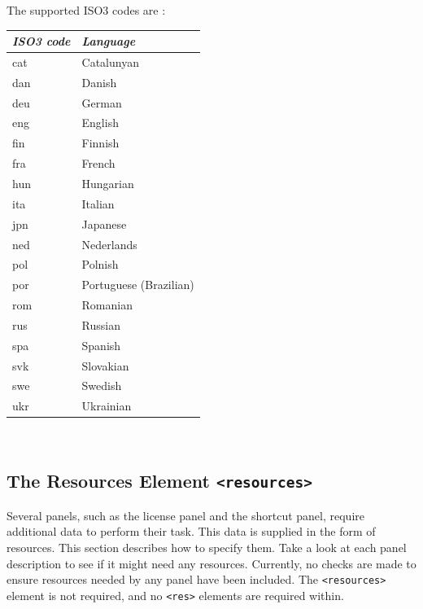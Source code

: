 The supported ISO3 codes are :
\begin{center}
\begin{tabular}{|l|l|}
\hline
\textit{ISO3 code} & \textit{Language} \\ \hline
cat & Catalunyan \\ \hline
dan & Danish \\ \hline
deu & German \\ \hline
eng & English \\ \hline
fin & Finnish \\ \hline
fra & French \\ \hline
hun & Hungarian \\ \hline
ita & Italian \\ \hline
jpn & Japanese \\ \hline
ned & Nederlands \\ \hline
pol & Polnish \\ \hline
por & Portuguese (Brazilian) \\ \hline
rom & Romanian \\ \hline
rus & Russian \\ \hline
spa & Spanish \\ \hline
svk & Slovakian \\ \hline
swe & Swedish \\ \hline
ukr & Ukrainian \\ \hline
\end{tabular}\
\end{center}

\subsection{The Resources Element \texttt{<resources>}}
\label{resources-element}

Several panels, such as the license panel and the shortcut panel,
require additional data to perform their task. This data is supplied
in the form of resources. This section describes how to specify
them. Take a look at each panel description to see if it might need
any resources. Currently, no checks are made to ensure resources
needed by any panel have been included. The \texttt{<resources>}
element is not required, and no \texttt{<res>} elements are required
within.\\

